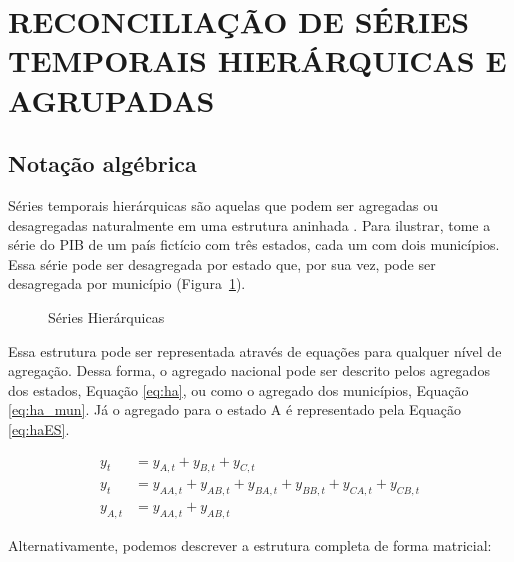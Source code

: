 \documentclass[
  12pt,
  twoside,
  openright,
  a4paper,
  chapter=TITLE,
  section=TITLE,
  brazil]{abntex2}
\begin{document}
\section{RECONCILIAÇÃO DE SÉRIES TEMPORAIS HIERÁRQUICAS E
AGRUPADAS}\label{reconciliauxe7uxe3o-de-suxe9ries-temporais-hieruxe1rquicas-e-agrupadas}

\subsection{Notação algébrica}\label{notauxe7uxe3o-alguxe9brica}

Séries temporais hierárquicas são aquelas que podem ser agregadas ou
desagregadas naturalmente em uma estrutura aninhada
\autocite{hyndman_forecasting_2021}. Para ilustrar, tome a série do PIB
de um país fictício com três estados, cada um com dois municípios. Essa
série pode ser desagregada por estado que, por sua vez, pode ser
desagregada por município (Figura~\ref{fig-h}).

\begin{figure}


\caption{\label{fig-h}Séries Hierárquicas}

\end{figure}%

Essa estrutura pode ser representada através de equações para qualquer
nível de agregação. Dessa forma, o agregado nacional pode ser descrito
pelos agregados dos estados, Equação \eqref{eq:ha}, ou como o agregado
dos municípios, Equação \eqref{eq:ha_mun}. Já o agregado para o estado A
é representado pela Equação \eqref{eq:haES}.

\begin{align}
y_t &= y_{A,t} + y_{B,t} + y_{C,t} \label{eq:ha} \\
y_t &= y_{AA,t} + y_{AB,t} + y_{BA,t} + y_{BB,t} + y_{CA,t} + y_{CB,t}\label{eq:ha_mun} \\
y_{A,t} &= y_{AA,t} + y_{AB,t}\label{eq:haES}
\end{align}

Alternativamente, podemos descrever a estrutura completa de forma
matricial:
\end{document}
